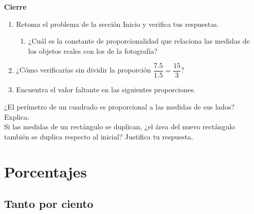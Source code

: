 \documentclass[11pt]{book}
\begin{document}
\begin{boxK}
  \begin{center}\textbf{Cierre}\end{center}

  \begin{enumerate}
    \item Retoma el problema de la sección Inicio y verifica tus respuestas.
          \begin{enumerate}
            \item ¿Cuál es la constante de proporcionalidad que relaciona las medidas de los
                  objetos reales con los de la fotografía?
          \end{enumerate}
    \item ¿Cómo verificarías sin dividir la proporción $\dfrac{7.5}{1.5} = \dfrac{15}{3}$?
    \item Encuentra el valor faltante en las siguientes proporciones.\\

  \end{enumerate}
\end{boxK}

\begin{boxH}
  ¿El perímetro de un cuadrado es proporcional a las medidas de sus lados?
  Explica.\\
  Si las medidas de un rectángulo se duplican, ¿el área del nuevo rectángulo
  también se duplica respecto al inicial? Justifica tu respuesta.
\end{boxH}

\newpage \thispagestyle{plain}
\section{Porcentajes}


\subsection{Tanto por ciento}
\end{document}
